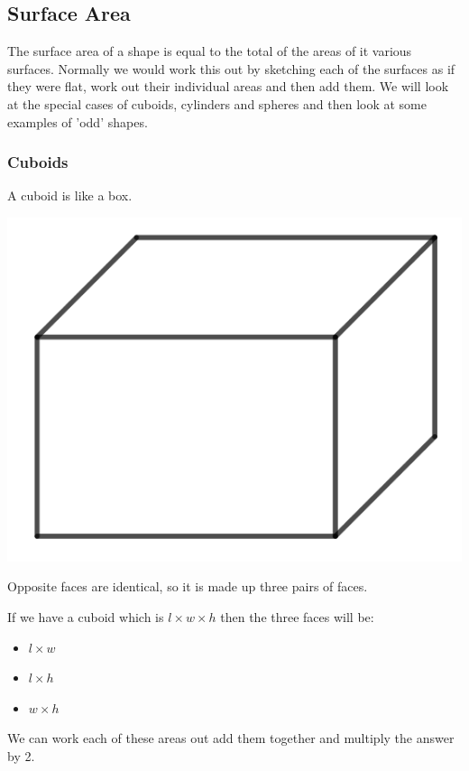 \subsection{Surface Area}
The surface area of a shape is equal to the total of the areas of it various surfaces.  Normally we would work this out by sketching each of the surfaces as if they were flat, work out their individual areas and then add them.  We will look at the special cases of cuboids, cylinders and spheres and then look at some examples of 'odd' shapes.
\subsubsection{Cuboids}
A cuboid is like a box.

\bigskip

\includegraphics{./Images/Measurement/CuboidPic.png}

\bigskip

Opposite faces are identical, so it is made up three pairs of faces.

If we have a cuboid which is $l \times w \times h$ then the three faces will be:

\begin{itemize}
	\item $l \times w$
	\item $l \times h$
	\item $w \times h$
\end{itemize}

We can work each of these areas out add them together and multiply the answer by 2.

